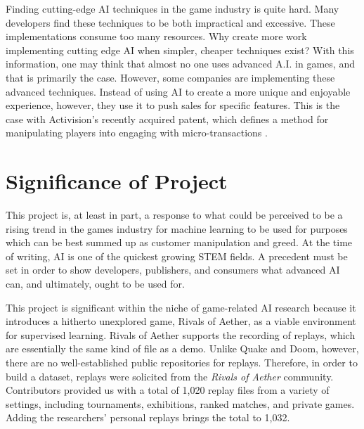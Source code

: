 Finding cutting-edge AI techniques in the game industry is quite hard. Many developers find these techniques to be both impractical and excessive. These implementations consume too many resources. Why create more work implementing cutting edge AI when simpler, cheaper techniques exist? With this information, one may think that almost no one uses advanced A.I. in games, and that is primarily the case. However, some companies are implementing these advanced techniques. Instead of using AI to create a more unique and enjoyable experience, however, they use it to push sales for specific features. This is the case with Activision's recently acquired patent, which defines a method for manipulating players into engaging with micro-transactions \cite{Marr:2017}.



\section{Significance of Project}

This project is, at least in part, a response to what could be perceived to be a rising trend in the games industry for machine learning to be used for purposes which can be best summed up as customer manipulation and greed. At the time of writing, AI is one of the quickest growing STEM fields. A precedent must be set in order to show developers, publishers, and consumers what advanced AI can, and ultimately, ought to be used for.

This project is significant within the niche of game-related AI research because it introduces a hitherto unexplored game, Rivals of Aether, as a viable environment for supervised learning. Rivals of Aether supports the recording of replays, which are essentially the same kind of file as a demo. Unlike Quake and Doom, however, there are no well-established public repositories for replays. Therefore, in order to build a dataset, replays were solicited from the {\it Rivals of Aether} community. Contributors provided us with a total of 1,020 replay files from a variety of settings, including tournaments, exhibitions, ranked matches, and private games. Adding the researchers' personal replays brings the total to 1,032.

